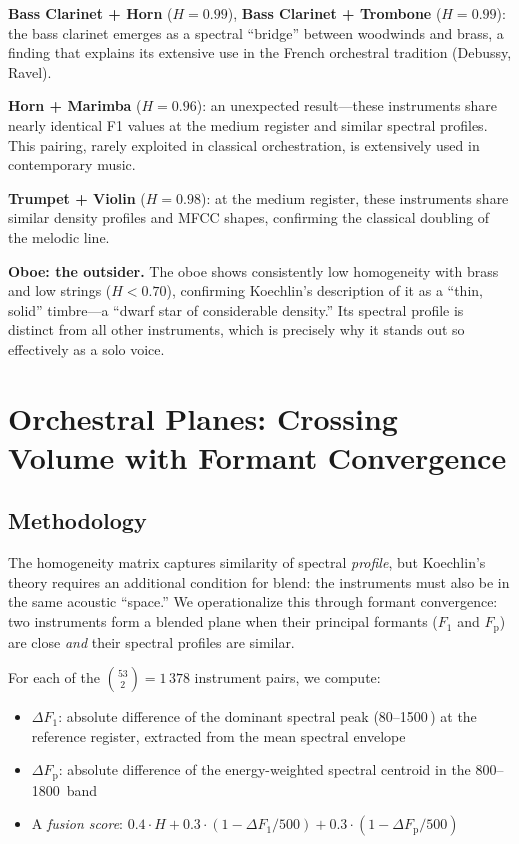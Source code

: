 \documentclass[journal]{IEEEtran}
\newcommand{\Fp}{F_\mathrm{p}}
\newcommand{\Hz}{\,\text{Hz}}
\begin{document}
\textbf{Bass Clarinet + Horn} ($H = 0.99$), \textbf{Bass Clarinet + Trombone} ($H = 0.99$): the bass clarinet emerges as a spectral ``bridge'' between woodwinds and brass, a finding that explains its extensive use in the French orchestral tradition (Debussy, Ravel).

\textbf{Horn + Marimba} ($H = 0.96$): an unexpected result---these instruments share nearly identical F1 values at the medium register and similar spectral profiles. This pairing, rarely exploited in classical orchestration, is extensively used in contemporary music.

\textbf{Trumpet + Violin} ($H = 0.98$): at the medium register, these instruments share similar density profiles and MFCC shapes, confirming the classical doubling of the melodic line.

\textbf{Oboe: the outsider.} The oboe shows consistently low homogeneity with brass and low strings ($H < 0.70$), confirming Koechlin's description of it as a ``thin, solid'' timbre---a ``dwarf star of considerable density.'' Its spectral profile is distinct from all other instruments, which is precisely why it stands out so effectively as a solo voice.

\section{Orchestral Planes: Crossing Volume with Formant Convergence}
\label{sec:planes}

\subsection{Methodology}

The homogeneity matrix captures similarity of spectral \emph{profile}, but Koechlin's theory requires an additional condition for blend: the instruments must also be in the same acoustic ``space.'' We operationalize this through formant convergence: two instruments form a blended plane when their principal formants ($F_1$ and $\Fp$) are close \emph{and} their spectral profiles are similar.

For each of the $\binom{53}{2} = 1\,378$ instrument pairs, we compute:
\begin{itemize}[nosep]
\item $\Delta F_1$: absolute difference of the dominant spectral peak (80--1500\Hz) at the reference register, extracted from the mean spectral envelope
\item $\Delta \Fp$: absolute difference of the energy-weighted spectral centroid in the 800--1800\Hz{} band
\item A \textit{fusion score}: $0.4 \cdot H + 0.3 \cdot (1 - \Delta F_1/500) + 0.3 \cdot (1 - \Delta\Fp/500)$
\end{itemize}
\end{document}
